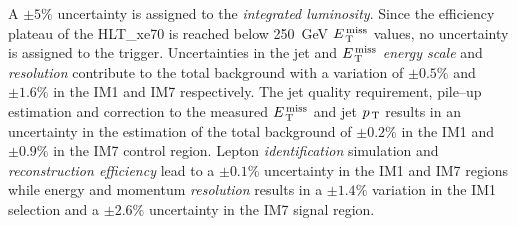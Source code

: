 A $\pm 5\%$ uncertainty is assigned to the \emph{integrated luminosity}. Since
the efficiency plateau of the HLT\_xe70 is reached below 250~GeV $E_\mathrm{\, T}^\mathrm{\, miss}$ values,
no uncertainty is assigned to the trigger. Uncertainties in the jet and $E_\mathrm{\, T}^\mathrm{\, miss}$
\emph{energy scale} and \emph{resolution} contribute to the total background
with a variation of $\pm 0.5\%$ and $\pm 1.6\%$ in the IM1 and IM7
respectively. The jet quality requirement, pile--up estimation and correction to
the measured $E_\mathrm{\, T}^\mathrm{\, miss}$ and jet $p_\mathrm{\, T}$ results in an uncertainty in the estimation of
the total background of $\pm 0.2\%$ in the IM1 and $\pm 0.9 \%$ in the IM7
control region. Lepton \emph{identification} simulation and
\emph{reconstruction efficiency} lead to a $\pm 0.1\%$ uncertainty in the IM1
and IM7 regions while energy and momentum \emph{resolution} results in a $\pm
1.4\%$ variation in the IM1 selection and a $\pm 2.6\%$ uncertainty in the IM7
signal region.
